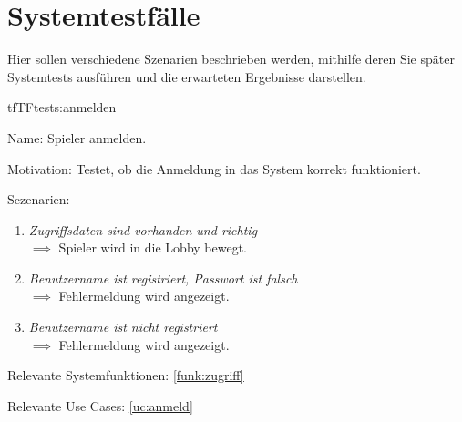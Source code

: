\chapter{Systemtestfälle}

Hier sollen verschiedene Szenarien beschrieben werden, mithilfe deren Sie später Systemtests ausführen und die erwarteten Ergebnisse darstellen.

\setcounter{tf}{10}

\begin{description}[leftmargin=5em, style=sameline]

\begin{lhp}{tf}{TF}{tests:anmelden}
	\item [Name:] Spieler anmelden.
	\item [Motivation:] Testet, ob die Anmeldung in das System korrekt funktioniert.
	\item [Sczenarien:] \hfill
		\begin{enumerate}
			\item \textit{Zugriffsdaten sind vorhanden und richtig} \\ $\implies$ Spieler wird in die Lobby bewegt.
			\item \textit{Benutzername ist registriert, Passwort ist falsch} \\ $\implies$ Fehlermeldung wird angezeigt.
			\item \textit{Benutzername ist nicht registriert} \\ $\implies$ Fehlermeldung wird angezeigt.
		\end{enumerate}
	\item [Relevante Systemfunktionen:] \ref{funk:zugriff}
	\item [Relevante Use Cases:] \ref{uc:anmeld}
\end{lhp}

\end{description}